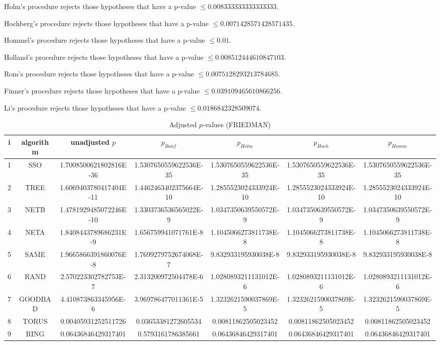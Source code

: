 \documentclass[a4paper,10pt]{article}
\begin{document}
\begin{landscape}
Holm's procedure rejects those hypotheses that have a p-value $\le0.008333333333333333$.


Hochberg's procedure rejects those hypotheses that have a p-value $\le0.0071428571428571435$.


Hommel's procedure rejects those hypotheses that have a p-value $\le0.01$.


Holland's procedure rejects those hypotheses that have a p-value $\le0.008512444610847103$.


Rom's procedure rejects those hypotheses that have a p-value $\le0.0075128293213784685$.


Finner's procedure rejects those hypotheses that have a p-value $\le0.039109465610866256$.


Li's procedure rejects those hypotheses that have a p-value $\le0.0186842328509074$.



\newpage

\begin{table}[!htp]
\centering\scriptsize
\caption{Adjusted $p$-values (FRIEDMAN)}
\begin{tabular}{ccccccc}
i&algorithm&unadjusted $p$&$p_{Bonf}$&$p_{Holm}$&$p_{Hoch}$&$p_{Homm}$\\
\hline
1& SSO&1.7008500621802816E-36&1.5307650559622536E-35&1.5307650559622536E-35&1.5307650559622536E-35&1.5307650559622536E-35\\
2& TREE&1.6069403780417404E-11&1.4462463402375664E-10&1.2855523024333924E-10&1.2855523024333924E-10&1.2855523024333924E-10\\
3& NETB&1.4781929485072246E-10&1.3303736536565022E-9&1.0347350639550572E-9&1.0347350639550572E-9&1.0347350639550572E-9\\
4& NETA&1.8408443789686231E-9&1.656759941071761E-8&1.1045066273811738E-8&1.1045066273811738E-8&1.1045066273811738E-8\\
5& SAME&1.9665866391860076E-8&1.7699279752674068E-7&9.832933195930038E-8&9.832933195930038E-8&9.832933195930038E-8\\
6& RAND&2.570223302782753E-7&2.313200972504478E-6&1.0280893211131012E-6&1.0280893211131012E-6&1.0280893211131012E-6\\
7& GOODBAD&4.410873863345956E-6&3.969786477011361E-5&1.3232621590037869E-5&1.3232621590037869E-5&1.3232621590037869E-5\\
8& TORUS&0.00405931252511726&0.03653381272605534&0.00811862505023452&0.00811862505023452&0.00811862505023452\\
9& RING&0.06436846429317401&0.5793161786385661&0.06436846429317401&0.06436846429317401&0.06436846429317401\\
\hline
\end{tabular}
\end{table}


\end{landscape}
\end{document}
